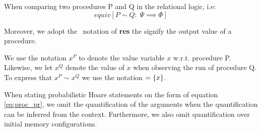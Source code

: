 When comparing two procedures P and Q in the relational logic, i.e:
\[
  equiv[P \sim Q :\; \Psi \implies \Phi]
\]

Moreover, we adopt the \easycrypt\ notation of \textbf{res} the signify the
output value of a procedure.

We use the notation $x^{P}$ to denote the value variable $x$ w.r.t. procedure P.
Likewise, we let $x^{Q}$ denote the value of $x$ when observing the run of
procedure Q. To express that $x^{P} \sim x^{Q}$ we use the notation $=\{x\}$.

When stating probabilistic Hoare statements on the form of equation
\ref{eq:proc_pr}, we omit the quantification of the arguments when the
quantification can be inferred from the context. Furthermore, we also omit
quantification over initial memory configurations.

